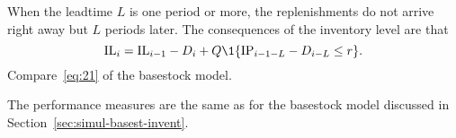 When the leadtime $L$ is one period or more, the replenishments do not
arrive right away but $L$ periods later. The consequences of the
inventory level are that
\begin{equation}
  \IL_i = \IL_{i-1} - D_i + Q\1{\IP_{i-1-L} - D_{i-L}\leq r}.
\end{equation}
Compare~\eqref{eq:21} of the basestock model.

The performance measures are the same as for the basestock model discussed in Section~\ref{sec:simul-basest-invent}.



